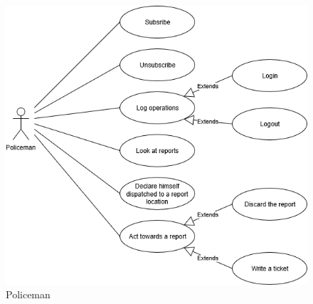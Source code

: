 	\begin{figure}[h!]
		\includegraphics[scale=0.75]{Images/UseCaseDiagram-Policeman}
		\caption{Policeman}
	\end{figure}
\newpage
	
